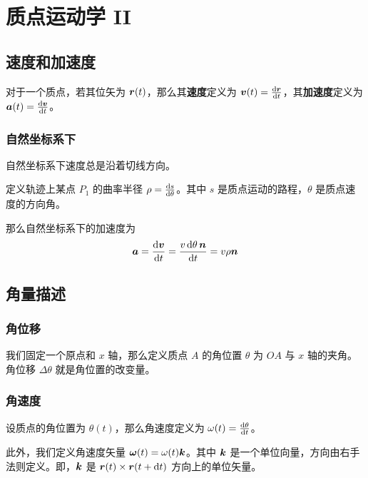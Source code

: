 \section{质点运动学 II}

\subsection{速度和加速度}

\begin{definition}
    对于一个质点，若其位矢为 $\boldsymbol{r}(t)$，那么其\textbf{速度}定义为 $\boldsymbol{v}(t) =\dv{\boldsymbol{r}}{t}$，其\textbf{加速度}定义为 $\boldsymbol{a}(t) =\dv{\boldsymbol{v}}{t}$。
\end{definition}

\subsubsection{自然坐标系下}

自然坐标系下速度总是沿着切线方向。

\begin{definition}[曲率半径]
    定义轨迹上某点 $P_1$ 的曲率半径 $\rho =\dv{s}{\theta}$。其中 $s$ 是质点运动的路程，$\theta$ 是质点速度的方向角。
\end{definition}

那么自然坐标系下的加速度为
$$
\boldsymbol{\boldsymbol{a}} = \dv{\boldsymbol{v}}{t} = \frac{v \dd{\theta} \boldsymbol{n}}{\dd{t}} = v \rho \boldsymbol{n}
$$

\subsection{角量描述}

\subsubsection{角位移}

我们固定一个原点和 $x$ 轴，那么定义质点 $A$ 的角位置 $\theta$ 为 $OA$ 与 $x$ 轴的夹角。角位移 $\Delta \theta$ 就是角位置的改变量。

\subsubsection{角速度}

设质点的角位置为 $\theta(t)$，那么角速度定义为 $\omega(t) = \dv{\theta}{t}$。

此外，我们定义角速度矢量 $\boldsymbol{\omega} (t) = \omega(t) \boldsymbol{k}$。其中 $\boldsymbol{k}$ 是一个单位向量，方向由右手法则定义。即，$\boldsymbol{k}$ 是 $\boldsymbol{r}(t) \times \boldsymbol{r}(t + \dd{t})$ 方向上的单位矢量。

